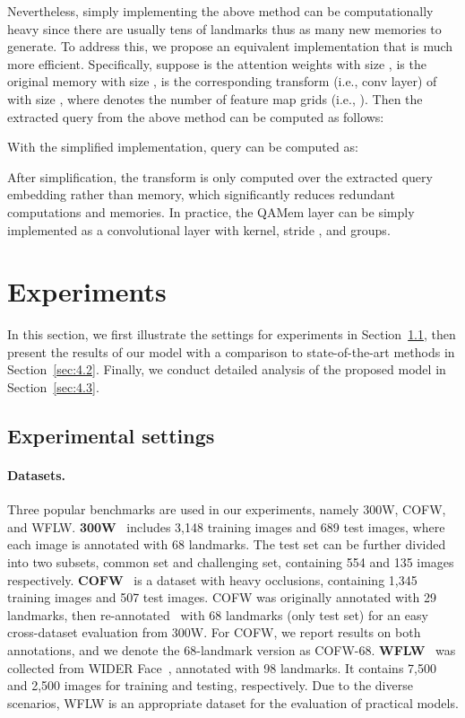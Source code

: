 \documentclass{article}
\begin{document}
Nevertheless, simply implementing the above method can be computationally heavy since there are usually tens of landmarks thus as many new memories to generate. To address this, we propose an equivalent implementation that is much more efficient. Specifically, suppose  is the attention weights with size ,  is the original memory with size ,  is the corresponding transform (i.e., conv layer) of  with size , where  denotes the number of feature map grids (i.e., ). Then the extracted query  from the above method can be computed as follows:

 



With the simplified implementation, query  can be computed as: 

 

After simplification, the transform is only computed over the extracted query embedding rather than memory, which significantly reduces redundant computations and memories. In practice, the QAMem layer can be simply implemented as a convolutional layer with  kernel, stride , and  groups.  

\section{Experiments}
\label{sec:4}

In this section, we first illustrate the settings for experiments in Section~\ref{sec:4.1}, then present the results of our model with a comparison to state-of-the-art methods in Section~\ref{sec:4.2}. Finally, we conduct detailed analysis of the proposed model in Section~\ref{sec:4.3}. 

\subsection{Experimental settings}
\label{sec:4.1}

\paragraph{Datasets.} 
Three popular benchmarks are used in our experiments, namely 300W, COFW, and WFLW. \textbf{300W}~\citep{STZ13} includes 3,148 training images and 689 test images, where each image is annotated with 68 landmarks. The test set can be further divided into two subsets, common set and challenging set, containing 554 and 135 images respectively. \textbf{COFW}~\citep{BPD13} is a dataset with heavy occlusions, containing 1,345 training images and 507 test images. COFW was originally annotated with 29 landmarks, then re-annotated~\citep{GhF14} with 68 landmarks (only test set) for an easy cross-dataset evaluation from 300W. For COFW, we report results on both annotations, and we denote the 68-landmark version as COFW-68. \textbf{WFLW}~\citep{WQY18} was collected from WIDER Face~\citep{YLL16}, annotated with 98 landmarks. It contains 7,500 and 2,500 images for training and testing, respectively. Due to the diverse scenarios, WFLW is an appropriate dataset for the evaluation of practical models. 
\end{document}
